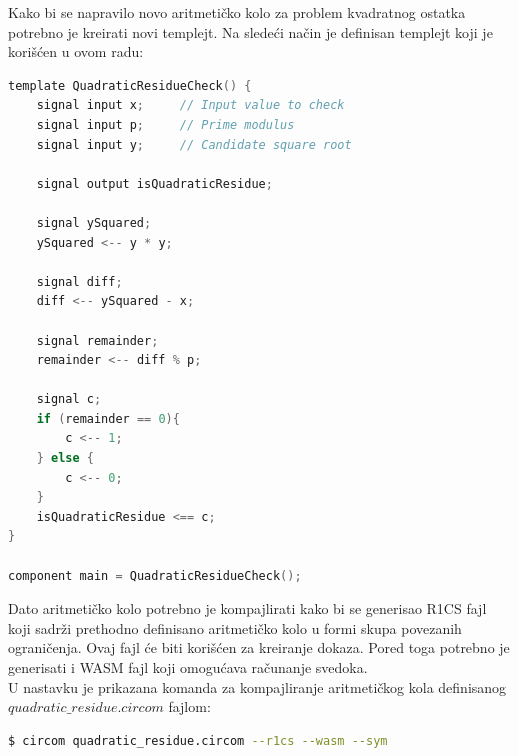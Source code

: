     Kako bi se napravilo novo aritmetičko kolo za problem kvadratnog ostatka potrebno je kreirati novi templejt. Na sledeći način je definisan templejt koji je korišćen u ovom radu:
\begin{english}
\begin{lstlisting}[language=c, caption={quadratic\_residue.circom},captionpos=b]
template QuadraticResidueCheck() {
	signal input x;     // Input value to check
	signal input p;     // Prime modulus
	signal input y;     // Candidate square root
	
	signal output isQuadraticResidue;
	
	signal ySquared;
	ySquared <-- y * y;
	
	signal diff;
	diff <-- ySquared - x;
	
	signal remainder;
	remainder <-- diff % p;
	
	signal c;
	if (remainder == 0){
		c <-- 1;
	} else {
		c <-- 0;
	}
	isQuadraticResidue <== c;
}

component main = QuadraticResidueCheck();
\end{lstlisting}
\end{english}


 Dato aritmetičko kolo potrebno je kompajlirati kako bi se generisao  \textenglish{R1CS} fajl  koji sadrži prethodno definisano aritmetičko kolo u formi skupa povezanih ograničenja. Ovaj fajl će biti korišćen za kreiranje dokaza. Pored toga potrebno je generisati i \textenglish{WASM}  fajl koji omogućava računanje svedoka. \\
 
 U nastavku je prikazana komanda za kompajliranje  aritmetičkog kola definisanog $quadratic\_residue.circom$ fajlom:\\
\begin{english}
\begin{lstlisting}[language=bash]
$ circom quadratic_residue.circom --r1cs --wasm --sym
\end{lstlisting}
\end{english}

